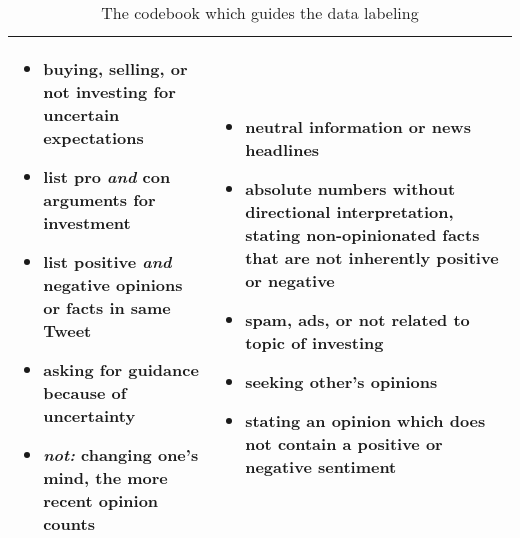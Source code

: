 \begin{table}[!ht]
\begin{tabular}{p{7.5cm}p{7.5cm}}
\begin{itemize}[noitemsep,leftmargin=*,topsep=-12pt]
	\item buying, selling, or not investing for uncertain expectations
	\item list pro \emph{and} con arguments for investment
	\item list positive \emph{and} negative opinions or facts in same Tweet
	\item asking for guidance because of uncertainty
	\item \emph{not:} changing one's mind, the more recent opinion counts

\end{itemize} & \begin{itemize}[noitemsep,leftmargin=*,topsep=-12pt]
	\item neutral information or news headlines
	\item absolute numbers without directional interpretation, stating non-opinionated facts that are not inherently positive or negative
	\item spam, ads, or not related to topic of investing
	\item seeking other's opinions
	\item stating an opinion which does not contain a positive or negative sentiment
\end{itemize}\\

\bottomrule
\end{tabular}
\caption{The codebook which guides the data labeling}
\label{table-codebook}
\end{table}